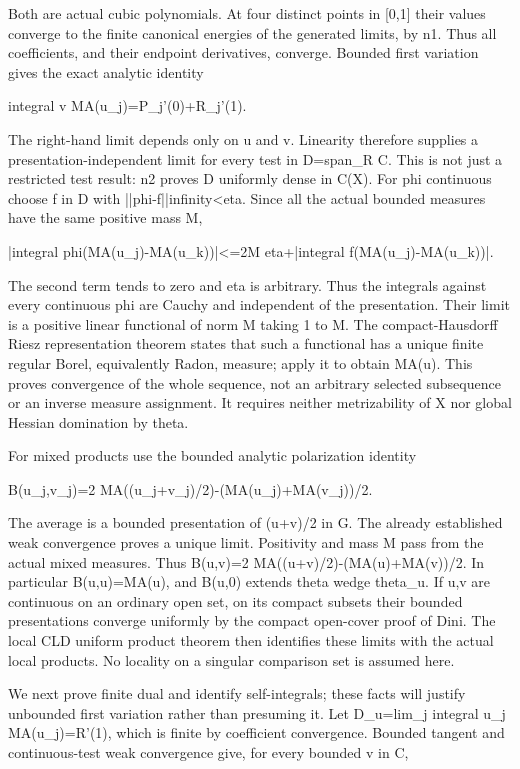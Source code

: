 \documentclass[11pt]{article}
\begin{document}
Both are actual cubic polynomials. At four distinct points in [0,1] their values converge to the finite canonical energies of the generated limits, by n1. Thus all coefficients, and their endpoint derivatives, converge. Bounded first variation gives the exact analytic identity

integral v MA(u\_j)=P\_j'(0)+R\_j'(1).

The right-hand limit depends only on u and v. Linearity therefore supplies a presentation-independent limit for every test in D=span\_R C. This is not just a restricted test result: n2 proves D uniformly dense in C(X). For phi continuous choose f in D with ||phi-f||infinity<eta. Since all the actual bounded measures have the same positive mass M,

|integral phi(MA(u\_j)-MA(u\_k))|<=2M eta+|integral f(MA(u\_j)-MA(u\_k))|.

The second term tends to zero and eta is arbitrary. Thus the integrals against every continuous phi are Cauchy and independent of the presentation. Their limit is a positive linear functional of norm M taking 1 to M. The compact-Hausdorff Riesz representation theorem states that such a functional has a unique finite regular Borel, equivalently Radon, measure; apply it to obtain MA(u). This proves convergence of the whole sequence, not an arbitrary selected subsequence or an inverse measure assignment. It requires neither metrizability of X nor global Hessian domination by theta.

For mixed products use the bounded analytic polarization identity

B(u\_j,v\_j)=2 MA((u\_j+v\_j)/2)-(MA(u\_j)+MA(v\_j))/2.

The average is a bounded presentation of (u+v)/2 in G. The already established weak convergence proves a unique limit. Positivity and mass M pass from the actual mixed measures. Thus B(u,v)=2 MA((u+v)/2)-(MA(u)+MA(v))/2. In particular B(u,u)=MA(u), and B(u,0) extends theta wedge theta\_u. If u,v are continuous on an ordinary open set, on its compact subsets their bounded presentations converge uniformly by the compact open-cover proof of Dini. The local CLD uniform product theorem then identifies these limits with the actual local products. No locality on a singular comparison set is assumed here.

We next prove finite dual and identify self-integrals; these facts will justify unbounded first variation rather than presuming it. Let D\_u=lim\_j integral u\_j MA(u\_j)=R'(1), which is finite by coefficient convergence. Bounded tangent and continuous-test weak convergence give, for every bounded v in C,
\end{document}

